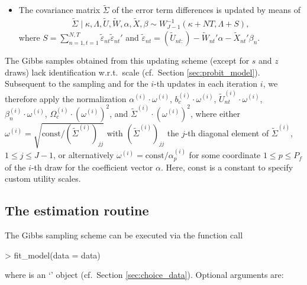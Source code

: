 \documentclass[article,shortnames]{jss}
\newcommand{\class}[1]{`\code{#1}'}
\begin{document}
\begin{itemize}
    \item The covariance matrix $\tilde{\Sigma}$ of the error term differences is updated by means of
  \begin{align*}
  \tilde{\Sigma} \mid \kappa,\Lambda,\tilde{U},\tilde{W},\alpha,\tilde{X},\beta \sim W^{-1}_{J-1}(\kappa+NT,\Lambda+S),
  \end{align*}
  where $S = \sum_{n=1,t=1}^{N,T} \tilde{\varepsilon}_{nt} \tilde{\varepsilon}_{nt}'$ and $\tilde{\varepsilon}_{nt} = (\tilde{U}_{nt:}) - \tilde{W}_{nt}'\alpha - \tilde{X}_{nt}'\beta_n$.
\end{itemize}

The Gibbs samples obtained from this updating scheme (except for $s$ and $z$ draws) lack identification w.r.t.\ scale (cf.\ Section \ref{sec:probit_model}). Subsequent to the sampling and for the $i$-th updates in each iteration $i$, we therefore apply the normalization $\alpha^{(i)} \cdot \omega^{(i)}$, $b_c^{(i)} \cdot \omega^{(i)}$, $\tilde{U}_{nt}^{(i)} \cdot \omega^{(i)}$, $\beta_n^{(i)} \cdot \omega^{(i)}$, $\Omega_c^{(i)} \cdot (\omega^{(i)})^2$, and $\tilde{\Sigma}^{(i)} \cdot (\omega^{(i)})^2$, where either $\omega^{(i)} = \sqrt{\text{const} / (\tilde{\Sigma}^{(i)})_{jj}}$ with $(\tilde{\Sigma}^{(i)})_{jj}$ the $j$-th diagonal element of $\tilde{\Sigma}^{(i)}$, $1\leq j \leq J-1$, or alternatively $\omega^{(i)} = \text{const} / \alpha^{(i)}_p$ for some coordinate $1\leq p \leq P_f$ of the $i$-th draw for the coefficient vector $\alpha$. Here, $\text{const}$ is a constant to specify custom utility scales.

\subsection{The estimation routine} \label{subsec:estimation_routine}

The Gibbs sampling scheme can be executed via the function call

\begin{Schunk}
\begin{Sinput}
> fit_model(data = data)
\end{Sinput}
\end{Schunk}

where  is an \class{RprobitB\_data} object (cf.\ Section \ref{sec:choice_data}). Optional arguments are:
\end{document}
